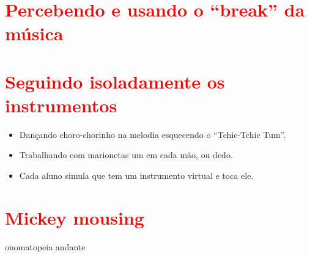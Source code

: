 \section{\textcolor{red}{Percebendo e usando o ``break'' da música}}




\section{\textcolor{red}{Seguindo isoladamente os instrumentos}}
\begin{itemize}
\item Dançando choro-chorinho na melodia esquecendo o ``Tchic-Tchic Tum''.
\item Trabalhando com marionetas um em cada mão, ou dedo.
\item Cada aluno simula que tem um instrumento virtual e toca ele.
\end{itemize}

\section{\textcolor{red}{Mickey mousing}}

onomatopeia andante

